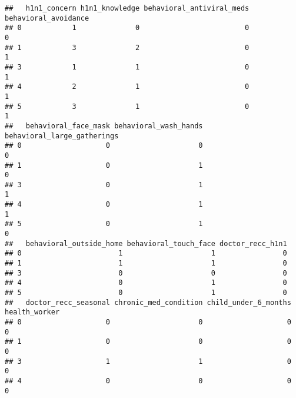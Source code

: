 \documentclass[
]{article}
\newenvironment{Shaded}{\begin{snugshade}}{\end{snugshade}}
\newcommand{\AttributeTok}[1]{\textcolor[rgb]{0.13,0.29,0.53}{#1}}
\newcommand{\CommentTok}[1]{\textcolor[rgb]{0.56,0.35,0.01}{\textit{#1}}}
\newcommand{\DecValTok}[1]{\textcolor[rgb]{0.00,0.00,0.81}{#1}}
\newcommand{\FunctionTok}[1]{\textcolor[rgb]{0.13,0.29,0.53}{\textbf{#1}}}
\newcommand{\NormalTok}[1]{#1}
\newcommand{\OtherTok}[1]{\textcolor[rgb]{0.56,0.35,0.01}{#1}}
\newcommand{\SpecialCharTok}[1]{\textcolor[rgb]{0.81,0.36,0.00}{\textbf{#1}}}
\newcommand{\StringTok}[1]{\textcolor[rgb]{0.31,0.60,0.02}{#1}}
\begin{document}
\begin{Shaded}
\end{Shaded}

\begin{verbatim}
##   h1n1_concern h1n1_knowledge behavioral_antiviral_meds behavioral_avoidance
## 0            1              0                         0                    0
## 1            3              2                         0                    1
## 3            1              1                         0                    1
## 4            2              1                         0                    1
## 5            3              1                         0                    1
##   behavioral_face_mask behavioral_wash_hands behavioral_large_gatherings
## 0                    0                     0                           0
## 1                    0                     1                           0
## 3                    0                     1                           1
## 4                    0                     1                           1
## 5                    0                     1                           0
##   behavioral_outside_home behavioral_touch_face doctor_recc_h1n1
## 0                       1                     1                0
## 1                       1                     1                0
## 3                       0                     0                0
## 4                       0                     1                0
## 5                       0                     1                0
##   doctor_recc_seasonal chronic_med_condition child_under_6_months health_worker
## 0                    0                     0                    0             0
## 1                    0                     0                    0             0
## 3                    1                     1                    0             0
## 4                    0                     0                    0             0

\end{verbatim}
\end{document}
